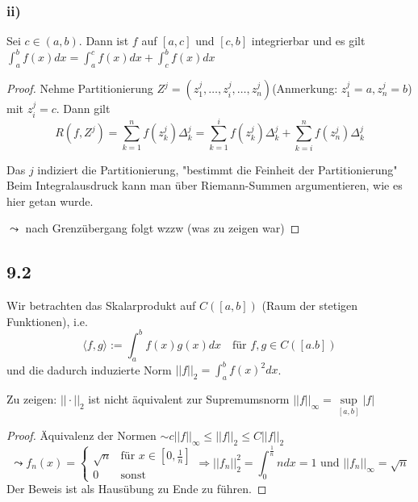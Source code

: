 \documentclass[
    accentcolor=pink,
    boxarc,
    dark_mode,
    logofile=enmpty
]{rubos-tuda-template}
\begin{document}
    \subsubsection*{ii)}
    Sei $c \in (a,b)$. Dann ist $f$ auf $[a,c]$ und $[c,b]$ integrierbar und es gilt $\displaystyle{\int_{a}^{b}f(x)dx = \int_{a}^{c}f(x)dx + \int_{c}^{b}f(x)dx}$
    \begin{proof}
        Nehme Partitionierung $Z^j = (z_1^j, \dots, z_i^j, \dots ,z_n^j)$(Anmerkung: $z_1^j = a, z_n^j = b$) mit $z_i^j = c$. Dann gilt
        \[R(f, Z^j) = \sum_{k=1}^{n}f(z_k^j)\Delta_k^j = \sum_{k=1}^{i}f(z_k^j) \Delta_k^j + \sum_{k=i}^{n}f(z_n^j)\Delta_k^j\]
        \begin{anmerkungen}
            Das $j$ indiziert die Partitionierung, "bestimmt die Feinheit der Partitionierung"\\
            Beim Integralausdruck kann man über Riemann-Summen argumentieren, wie es hier getan wurde.
        \end{anmerkungen}
        $\leadsto$ nach Grenzübergang folgt wzzw (was zu zeigen war)
    \end{proof}

    \subsection*{9.2}
    Wir betrachten das Skalarprodukt auf $C([a,b])$ (Raum der stetigen Funktionen), i.e.
    \[\langle f,g \rangle := \int_{a}^{b}f(x)g(x)dx \quad \text{für } f,g \in C([a.b])\]
    und die dadurch induzierte Norm $\displaystyle{||f||_2 = \int_{a}^{b}f(x)^2dx}$.

    Zu zeigen: $||\cdot||_2$ ist nicht äquivalent zur Supremumsnorm $||f||_\infty = \underset{[a,b]}{\sup}|f|$
    \begin{proof}
        Äquivalenz der Normen $\sim c||f||_\infty\le ||f||_2\le C||f||_2$
        \[\leadsto f_n(x) = \begin{cases}
                \sqrt{n} & \text{für }x \in [0, \frac{1}{n}] \\
                0        & \text{sonst}
            \end{cases} \Rightarrow ||f_n||_2^2 = \int_{0}^{\frac{1}{n}}ndx=1 \text{ und } ||f_n||_\infty = \sqrt{n}\]
        Der Beweis ist als Hausübung zu Ende zu führen.
    \end{proof}
\end{document}
